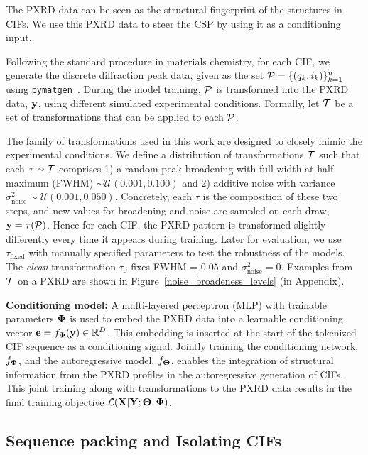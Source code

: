 The PXRD data can be seen as the structural fingerprint of the structures in CIFs. We use this PXRD data to steer the CSP by using it as a conditioning input. 

Following the standard procedure in materials chemistry, for each CIF, we generate the discrete diffraction peak data, given as the set ${\mathcal P} = \{(q_k,i_k)\}_{k=1}^n$ using \texttt{\small pymatgen}~\cite{Ong2013}. During the model training, ${\mathcal P}$ is transformed into the PXRD data, ${\mathbf y}$, using different simulated experimental conditions. Formally, let ${\mathcal T}$ be a set of transformations that can be applied to each ${\mathcal P}$.

The family of transformations used in this work are designed to closely mimic the experimental conditions. 
We define a distribution of transformations ${\mathcal T}$ such that each $\tau \sim {\mathcal T}$ comprises 1) a random peak broadening with full width at half maximum (FWHM) $\sim\mathcal{U}(0.001, 0.100)$ and 2) additive noise with variance $\sigma_{\mathrm{noise}}^2\sim\mathcal{U}(0.001, 0.050)$. Concretely, each $\tau$ is the composition of these two steps, and new values for broadening and noise are sampled on each draw, ${\mathbf y} = \tau({\mathcal P})$. Hence for each CIF, the PXRD pattern is transformed slightly differently every time it appears during training. Later for evaluation, we use $\tau_{\mathrm{fixed}}$ with manually specified parameters to test the robustness of the models. The \textit{clean} transformation $\tau_0$ fixes FWHM = $0.05$ and $\sigma_{\mathrm{noise}}^2=0$. Examples from ${\mathcal T}$ on a PXRD are shown in Figure~\ref{noise_broadeness_levels} (in Appendix).

{\bf Conditioning model:} A multi-layered perceptron (MLP) with trainable parameters ${\mathbf{\Phi}}$ is used to embed the PXRD data into a learnable conditioning vector ${\mathbf e} = f_{\mathbf{\Phi}}({\mathbf y}) \in \mathbb{R}^D$. This embedding is inserted at the start of the tokenized CIF sequence as a conditioning signal. Jointly training the conditioning network, $f_{\mathbf{\Phi}}$, and the autoregressive model, $f_{\mathbf \Theta}$, enables the integration of structural information from the PXRD profiles in the autoregressive generation of CIFs. This joint training along with transformations to the PXRD data results in the final training objective ${\mathcal L}({\mathbf X}|{\mathbf Y};{\mathbf \Theta},{\mathbf{\Phi}})$.

\subsection{Sequence packing and Isolating CIFs} \label{sec:EfficientBatching}

